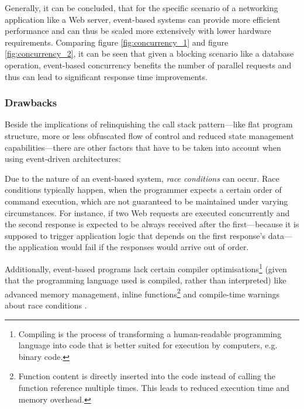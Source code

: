 Generally, it can be concluded, that for the specific scenario of a networking application like a Web server, event-based systems can provide more efficient performance and can thus be scaled more extensively with lower hardware requirements. Comparing figure \ref{fig:concurrency_1} and figure \ref{fig:concurrency_2}, it can be seen that given a blocking scenario like a database operation, event-based concurrency benefits the number of parallel requests and thus can lead to significant response time improvements.

\subsubsection*{Drawbacks}
Beside the implications of relinquishing the call stack pattern---like flat program structure, more or less obfuscated flow of control and reduced state management capabilities---there are other factors that have to be taken into account when using event-driven architectures:

Due to the nature of an event-based system, \textit{race conditions} can occur. Race conditions typically happen, when the programmer expects a certain order of command execution, which are not guaranteed to be maintained under varying circumstances. For instance, if two Web requests are executed concurrently and the second response is expected to be always received after the first---because it is supposed to trigger application logic that depends on the first response's data---the application would fail if the responses would arrive out of order.

Additionally, event-based programs lack certain compiler optimisations\footnote{Compiling is the process of transforming a human-readable programming language into code that is better suited for execution by computers, e.g. binary code.} (given that the programming language used is compiled, rather than interpreted) like advanced memory management, inline functions\footnote{Function content is directly inserted into the code instead of calling the function reference multiple times. This leads to reduced execution time and memory overhead.} and compile-time warnings about race conditions \cite[p. 5]{Behren2003}.


